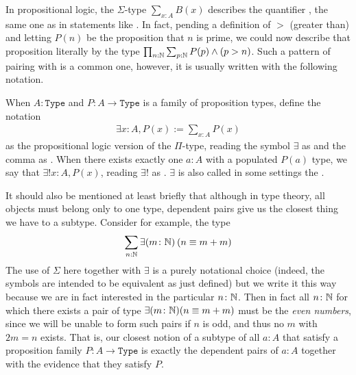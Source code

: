 \documentclass[11pt]{article}
\begin{document}
In propositional logic, the $\Sigma$-type $\sum_{x : A} B(x)$ describes the quantifier , the same one as in statements like . In fact, pending a definition of $>$ (greater than) and letting $P(n)$ be the proposition that $n$ is prime, we could now describe that proposition literally by the type $\prod_{n : \mathbb{N}} \sum_{p : \mathbb{N}} P(p) \wedge (p > n)$. Such a pattern of pairing  with  is a common one, however, it is usually written with the following notation.

\begin{notation}
When $A\colon \mathtt{Type}$ and $P\colon A \to \mathtt{Type}$ is a family of proposition types, define the notation \begin{gather*}
\exists x : A, P(x) := \sum_{x : A} P(x)
\end{gather*}
as the propositional logic version of the $\Pi$-type, reading the symbol $\exists$ as  and the comma as . When there exists exactly one $a \colon A$  with a populated $P(a)$ type, we say that $\exists ! x \colon A, P(x)$, reading $\exists !$ as . $\exists$ is also called in some settings the .
\end{notation}

It should also be mentioned at least briefly that although in type theory, all objects must belong only to one type, dependent pairs give us the closest thing we have to a subtype. Consider for example, the type \begin{gather*}
\sum_{n : \mathbb{N}} \exists (m \colon \mathbb{N}) \hspace{0.2em} (n \equiv m + m)
\end{gather*}
The use of $\Sigma$ here together with $\exists$ is a purely notational choice (indeed, the symbols are intended to be equivalent as just defined) but we write it this way because we are in fact interested in the particular $n \colon \mathbb{N}$. Then in fact all $n \colon \mathbb{N}$ for which there exists a pair of type $\exists (m \colon \mathbb{N}) (n \equiv m + m)$ must be the \emph{even numbers}, since we will be unable to form such pairs if $n$ is odd, and thus no $m$ with $2m = n$ exists. That is, our closest notion of a subtype of all $a \colon A$ that satisfy a proposition family $P\colon A \to \mathtt{Type}$ is exactly the dependent pairs of $a \colon A$ together with the evidence that they satisfy $P$.
\end{document}
